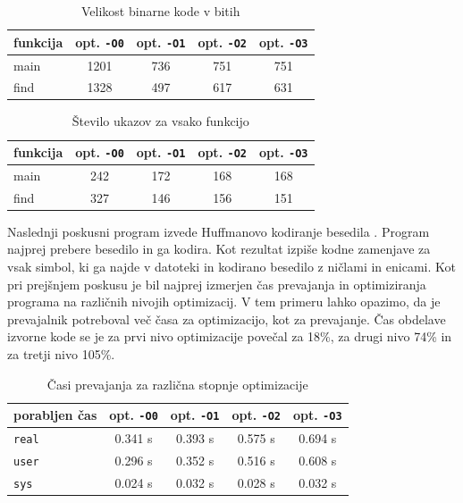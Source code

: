 \documentclass[a4paper, 12pt]{book}
\begin{document}
\begin{table}
	\begin{center}
		\begin{tabular}{l|cccc}
			funkcija & opt. {\tt -O0} & opt. {\tt -O1} & opt. {\tt -O2} & opt. {\tt -O3} \\ \hline
			main & 1201 & 736 & 751 & 751 \\
			find & 1328 & 497 & 617 & 631
		\end{tabular}
	\end{center}
	\caption{Velikost binarne kode v bitih}
	\label{tbl:3}
\end{table}

\begin{table}
	\begin{center}
		\begin{tabular}{l|cccc}
			funkcija & opt. {\tt -O0} & opt. {\tt -O1} & opt. {\tt -O2} & opt. {\tt -O3} \\ \hline
			main & 242 & 172 & 168 & 168 \\
			find & 327 & 146 & 156 & 151
		\end{tabular}
	\end{center}
	\caption{Število ukazov za vsako funkcijo}
	\label{tbl:4}
\end{table}

Naslednji poskusni program izvede Huffmanovo kodiranje besedila \cite{huff,code1}. Program najprej prebere besedilo in ga kodira. Kot rezultat izpiše kodne zamenjave za vsak simbol, ki ga najde v datoteki in kodirano besedilo z ničlami in enicami. Kot pri prejšnjem poskusu je bil najprej izmerjen čas prevajanja in optimiziranja programa na različnih nivojih optimizacij. V tem primeru lahko opazimo, da je prevajalnik potreboval več časa za optimizacijo, kot za prevajanje. Čas obdelave izvorne kode se je za prvi nivo optimizacije povečal za 18\%, za drugi nivo 74\% in za tretji nivo 105\%.

\begin{table}
	\begin{center}
		\begin{tabular}{l|cccc}
			porabljen čas & opt. {\tt -O0} & opt. {\tt -O1} & opt. {\tt -O2} & opt. {\tt -O3} \\ \hline
			{\tt real} & 0.341 s & 0.393 s & 0.575 s & 0.694 s \\
			{\tt user} & 0.296 s & 0.352 s & 0.516 s & 0.608 s \\
			{\tt sys}  & 0.024 s & 0.032 s & 0.028 s & 0.032 s
		\end{tabular}
	\end{center}
	\caption{Časi prevajanja za različna stopnje optimizacije}
	\label{tbl:5}
\end{table}
\end{document}
